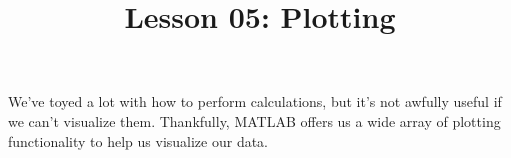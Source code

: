 \documentclass{article}
\title{Lesson 05: Plotting}
\begin{document}
\renderTitle

We've toyed a lot with how to perform calculations, but it's not awfully
useful if we can't visualize them.  Thankfully, MATLAB offers us a wide
array of plotting functionality to help us visualize our data.
\end{document}
